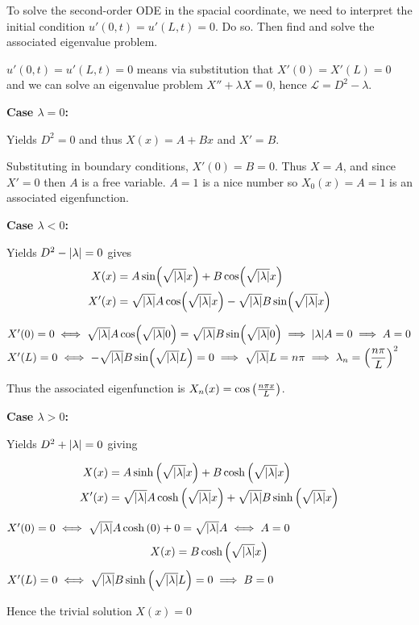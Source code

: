 To solve the second-order ODE in the spacial coordinate, we need to interpret
the initial condition $u'(0,t) = u'(L,t) = 0$. Do so. Then find and solve the
associated eigenvalue problem.

\soln* $u'(0,t) = u'(L,t) = 0$ means via substitution that $X'(0) = X'(L) = 0$ and we can solve an eigenvalue problem $X''+\lambda X = 0$, hence $\mathcal{L} = D^2 - \lambda$.

\nl \textbf{Case $\lambda = 0$:}

Yields $D^2 = 0$ and thus $X(x) = A + Bx$ and $X' = B$. 

\nl Substituting in boundary conditions, $X'(0) = B = 0$. Thus $X = A$, and since $X' = 0$ then $A$ is a free variable. $A = 1$ is a nice number so $X_0(x) = A = 1$ is an associated eigenfunction.

\nnl \textbf{Case $\lambda < 0$:}

Yields $D^2 - \abs{\lambda} = 0$ gives
\begin{align*}
    X(x) &= A\sin(\sqrt{\abs{\lambda}} x) + B \cos(\sqrt{\abs{\lambda}} x)\\
    X'(x) &= \sqrt{\abs{\lambda}} A \cos(\sqrt{\abs{\lambda}} x) - \sqrt{\abs{\lambda}} B \sin(\sqrt{\abs{\lambda}} x)
\end{align*}

$X'(0) = 0 \iff \sqrt{\abs{\lambda}} A \cos(\sqrt{\abs{\lambda}} 0) = \sqrt{\abs{\lambda}} B \sin(\sqrt{\abs{\lambda}} 0) \implies \abs{\lambda} A = 0 \implies A = 0$
$X'(L) = 0 \iff - \rabsl B \sin(\rabsl L) = 0 \implies \rabsl L = n \pi \implies \lambda_n = \pfrac*{\np}{L}^2 $

Thus the associated eigenfunction is $X_n(x) = \cosp{\npxl}$.

\nnl \textbf{Case $\lambda > 0$:}

Yields $D^2 + \abs{\lambda} = 0$ giving 

\begin{align*}
    X(x) &= A \sinhp{\rabsl x} + B \coshp{\rabsl x}\\
    X'(x) &= \rabsl A \coshp{\rabsl x} + \rabsl B \sinhp{\rabsl x}
\end{align*}

$X'(0) = 0 \iff \rabsl A \coshp{0} + 0 = \rabsl A \iff A = 0$
$$X(x) = B \coshp{\rabsl x}$$
$X'(L) = 0 \iff \rabsl B \sinhp{\rabsl L} = 0 \implies B = 0$

Hence the trivial solution $X(x) = 0$
